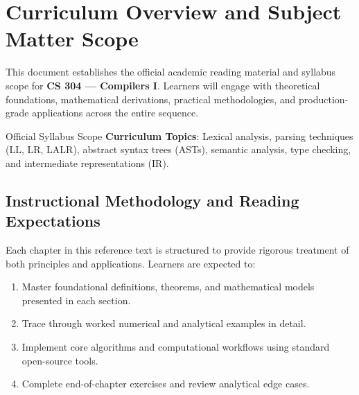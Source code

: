 \section{Curriculum Overview and Subject Matter Scope}

This document establishes the official academic reading material and syllabus scope for \textbf{CS 304 --- Compilers I}. Learners will engage with theoretical foundations, mathematical derivations, practical methodologies, and production-grade applications across the entire sequence.

\begin{InsightBox}{Official Syllabus Scope}
  \textbf{Curriculum Topics}: Lexical analysis, parsing techniques (LL, LR, LALR), abstract syntax trees (ASTs), semantic analysis, type checking, and intermediate representations (IR).
\end{InsightBox}

\subsection{Instructional Methodology and Reading Expectations}

Each chapter in this reference text is structured to provide rigorous treatment of both principles and applications. Learners are expected to:
\begin{enumerate}
  \item Master foundational definitions, theorems, and mathematical models presented in each section.
  \item Trace through worked numerical and analytical examples in detail.
  \item Implement core algorithms and computational workflows using standard open-source tools.
  \item Complete end-of-chapter exercises and review analytical edge cases.
\end{enumerate}

